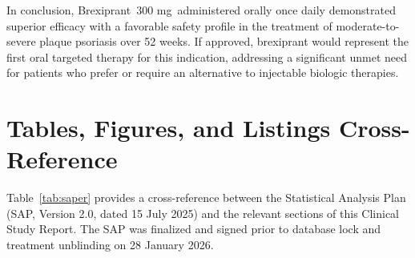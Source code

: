 \documentclass[11pt, a4paper]{article}
\newcommand{\studydrug}{Brexiprant}
\newcommand{\studydose}{300 mg}
\begin{document}
\vspace{4pt}
In conclusion, \studydrug\ \studydose\ administered orally once daily demonstrated superior efficacy with a favorable safety profile in the treatment of moderate-to-severe plaque psoriasis over 52 weeks. If approved, brexiprant would represent the first oral targeted therapy for this indication, addressing a significant unmet need for patients who prefer or require an alternative to injectable biologic therapies.

\newpage

\section{Tables, Figures, and Listings Cross-Reference}
\label{sec:saper}

Table~\ref{tab:saper} provides a cross-reference between the Statistical Analysis Plan (SAP, Version 2.0, dated 15 July 2025) and the relevant sections of this Clinical Study Report. The SAP was finalized and signed prior to database lock and treatment unblinding on 28 January 2026.
\end{document}
